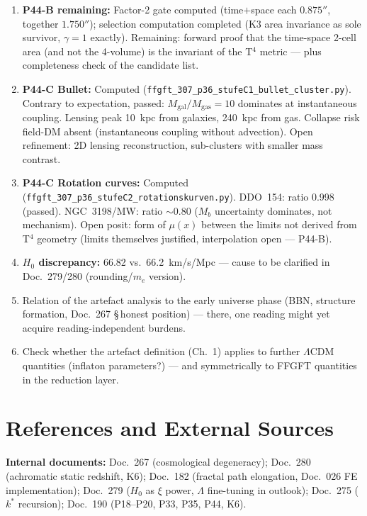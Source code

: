 \documentclass[11pt]{report}
\begin{document}
\begin{enumerate}
  \item \textbf{P44-B remaining:} Factor-2 gate computed (time$+$space
        each $0.875''$, together $1.750''$); selection computation
        completed (K3 area invariance as sole survivor, $\gamma = 1$
        exactly). Remaining: forward proof that the time-space 2-cell
        area (and not the 4-volume) is the invariant of the T$^4$ metric
        — plus completeness check of the candidate list.
  \item \textbf{P44-C Bullet:} Computed
        (\texttt{ffgft\_307\_p36\_stufeC1\_bullet\_cluster.py}).
        Contrary to expectation, passed: $M_\text{gal}/M_\text{gas}=10$
        dominates at instantaneous coupling. Lensing peak 10~kpc from
        galaxies, 240~kpc from gas. Collapse risk field-DM absent
        (instantaneous coupling without advection). Open refinement:
        2D lensing reconstruction, sub-clusters with smaller mass contrast.
  \item \textbf{P44-C Rotation curves:} Computed
        (\texttt{ffgft\_307\_p36\_stufeC2\_rotationskurven.py}).
        DDO~154: ratio 0.998 (passed). NGC~3198/MW: ratio $\sim$0.80
        ($M_b$ uncertainty dominates, not mechanism). Open posit: form
        of $\mu(x)$ between the limits not derived from T$^4$ geometry
        (limits themselves justified, interpolation open — P44-B).
  \item \textbf{$H_0$ discrepancy:} 66.82 vs.\ 66.2~km/s/Mpc —
        cause to be clarified in Doc.~279/280 (rounding/$m_e$ version).
  \item Relation of the artefact analysis to the early universe phase
        (BBN, structure formation, Doc.~267 §\,honest position) — there,
        one reading might yet acquire reading-independent burdens.
  \item Check whether the artefact definition (Ch.~1) applies to further
        $\Lambda$CDM quantities (inflaton parameters?) — and symmetrically
        to FFGFT quantities in the reduction layer.
\end{enumerate}

\chapter{References and External Sources}

\textbf{Internal documents:}
Doc.~267 (cosmological degeneracy);
Doc.~280 (achromatic static redshift, K6);
Doc.~182 (fractal path elongation, Doc.~026 FE implementation);
Doc.~279 ($H_0$ as $\xi$ power, $\Lambda$ fine-tuning in outlook);
Doc.~275 ($k^*$ recursion);
Doc.~190 (P18--P20, P33, P35, P44, K6).
\end{document}
